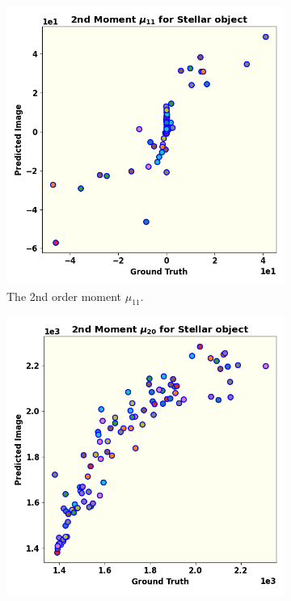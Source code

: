 \documentclass[fleqn,usenatbib,twocolumn]{mnras}
\begin{document}
\begin{figure}
	\centering
	\begin{subfigure}{0.33\linewidth}
		\includegraphics[width=\linewidth]{../fig/moments/mom3.png}
		\caption{The 2nd order moment $\mu_{11}$.}
		\label{fig:mom4}
	\end{subfigure}\hfill
	\begin{subfigure}{0.33\linewidth}
		\includegraphics[width=\linewidth]{../fig/moments/mom4.png}

\end{subfigure}
\end{figure}
\end{document}
